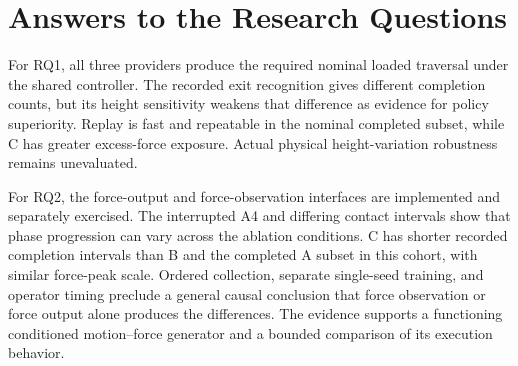 \section{Answers to the Research Questions}
For RQ1, all three providers produce the required nominal loaded traversal under the shared controller. The recorded exit recognition gives different completion counts, but its height sensitivity weakens that difference as evidence for policy superiority. Replay is fast and repeatable in the nominal completed subset, while C has greater excess-force exposure. Actual physical height-variation robustness remains unevaluated.

For RQ2, the force-output and force-observation interfaces are implemented and separately exercised. The interrupted A4 and differing contact intervals show that phase progression can vary across the ablation conditions. C has shorter recorded completion intervals than B and the completed A subset in this cohort, with similar force-peak scale. Ordered collection, separate single-seed training, and operator timing preclude a general causal conclusion that force observation or force output alone produces the differences. The evidence supports a functioning conditioned motion--force generator and a bounded comparison of its execution behavior.
